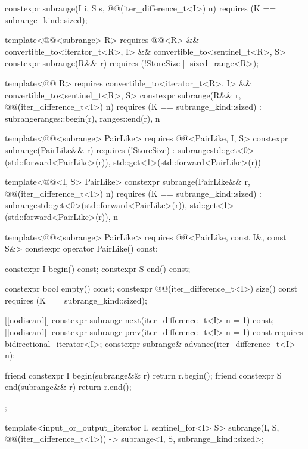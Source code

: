 \begin{codeblock}
{{    constexpr subrange(I i, S s, @@(iter_difference_t<I>) n)
      requires (K == subrange_kind::sized);

    template<@@<subrange> R>
      requires @@<R> &&
        convertible_to<iterator_t<R>, I> && convertible_to<sentinel_t<R>, S>
    constexpr subrange(R&& r) requires (!StoreSize || sized_range<R>);

    template<@@ R>
      requires convertible_to<iterator_t<R>, I> && convertible_to<sentinel_t<R>, S>
    constexpr subrange(R&& r, @@(iter_difference_t<I>) n)
      requires (K == subrange_kind::sized)
        : subrange{ranges::begin(r), ranges::end(r), n}
    {}

    template<@@<subrange> PairLike>
      requires @@<PairLike, I, S>
    constexpr subrange(PairLike&& r) requires (!StoreSize)
      : subrange{std::get<0>(std::forward<PairLike>(r)),
                 std::get<1>(std::forward<PairLike>(r))}
    {}

    template<@@<I, S> PairLike>
    constexpr subrange(PairLike&& r, @@(iter_difference_t<I>) n)
      requires (K == subrange_kind::sized)
      : subrange{std::get<0>(std::forward<PairLike>(r)),
                 std::get<1>(std::forward<PairLike>(r)), n}
    {}

    template<@@<subrange> PairLike>
      requires @@<PairLike, const I&, const S&>
    constexpr operator PairLike() const;

    constexpr I begin() const;
    constexpr S end() const;

    constexpr bool empty() const;
    constexpr @@(iter_difference_t<I>) size() const
      requires (K == subrange_kind::sized);

    [[nodiscard]] constexpr subrange next(iter_difference_t<I> n = 1) const;
    [[nodiscard]] constexpr subrange prev(iter_difference_t<I> n = 1) const
      requires bidirectional_iterator<I>;
    constexpr subrange& advance(iter_difference_t<I> n);

    friend constexpr I begin(subrange&& r) { return r.begin(); }
    friend constexpr S end(subrange&& r) { return r.end(); }
  };

  template<input_or_output_iterator I, sentinel_for<I> S>
    subrange(I, S, @@(iter_difference_t<I>)) ->
      subrange<I, S, subrange_kind::sized>;

}
\end{codeblock}
